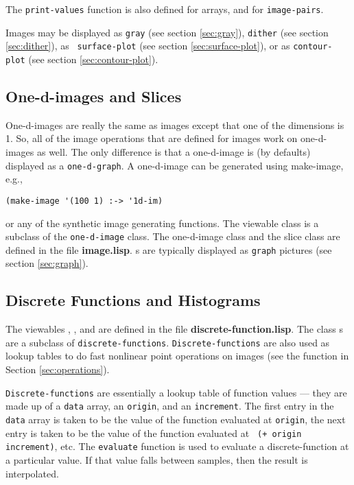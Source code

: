 The {\tt print-values} function is also defined for arrays, and for
{\tt image-pairs}.  


Images may be displayed as {\tt gray} (see section \ref{sec:gray}),
{\tt dither} (see section \ref{sec:dither}), as {\tt
surface-plot} (see section \ref{sec:surface-plot}), or as 
{\tt contour-plot} (see section \ref{sec:contour-plot}).


\subsection{One-d-images and Slices}
\label{sec:one-d-images}

One-d-images are really the same as images except that one of the
dimensions is 1.  So, all of the image operations that are defined for
images work on one-d-images as well.  The only difference is that a
one-d-image is (by defaults) displayed as a {\tt one-d-graph}.  A
one-d-image can be generated using make-image, e.g.,
\begin{verbatim}
(make-image '(100 1) :-> '1d-im)
\end{verbatim}
or any of the synthetic image generating functions.  The 
viewable class is a subclass of the {\tt one-d-image} class.  The
one-d-image class and the slice class are defined in the file {\bf
image.lisp}.  s are typically displayed as
{\tt graph} pictures (see section \ref{sec:graph}).  


\subsection{Discrete Functions and Histograms}
\label{sec:discrete-function}

The viewables , , and
 are defined in the file {\bf
discrete-function.lisp}.  The class s are a subclass
of {\tt discrete-functions}.  {\tt Discrete-functions} are also used
as lookup tables to do fast nonlinear point operations on images (see
the function  in Section \ref{sec:operations}).

{\tt Discrete-functions} are essentially a lookup table of function
values --- they are made up of a {\tt data} array, an {\tt origin},
and an {\tt increment}.  The first entry in the {\tt data} array is
taken to be the value of the function evaluated at {\tt origin}, the
next entry is taken to be the value of the function evaluated at {\tt
(+ origin increment)}, etc.  The {\tt evaluate} function is used to
evaluate a discrete-function at a particular value.  If that value
falls between samples, then the result is interpolated.

